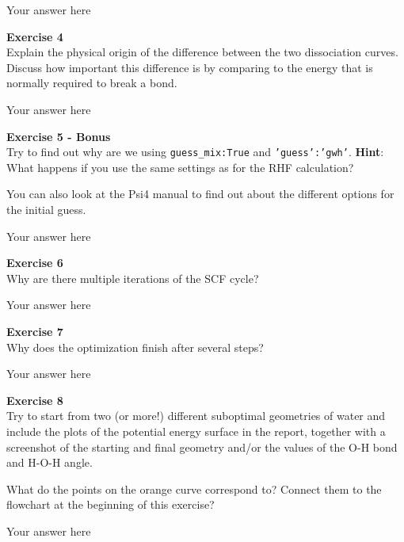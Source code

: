 \documentclass{article}
\begin{document}
Your answer here

\begin{mdframed}
\textbf{Exercise 4}\\
Explain the physical origin of the difference between the two
dissociation curves. Discuss how important this difference is by
comparing to the energy that is normally required to break a bond.
\end{mdframed}

Your answer here

\begin{mdframed}
\textbf{Exercise 5 - Bonus}\\
Try to find out why are we using \texttt{guess\_mix:True} and \texttt{'guess':'gwh'}. \textbf{Hint}: What happens if you use the same settings as for the RHF calculation?

You can also look at the Psi4 manual to find out about the different options for the initial guess.
\end{mdframed}

Your answer here

\begin{mdframed}
\textbf{Exercise 6}\\
Why are there multiple iterations of the SCF cycle?
\end{mdframed}

Your answer here

\begin{mdframed}
\textbf{Exercise 7}\\
Why does the optimization finish after several steps?
\end{mdframed}

Your answer here

\begin{mdframed}
\textbf{Exercise 8}\\
Try to start from two (or more!) different suboptimal geometries of water and include the plots of the potential energy surface in the report, together with a screenshot of the starting and final geometry and/or the values of the O-H bond and H-O-H angle.

What do the points on the orange curve correspond to? Connect them to the flowchart at the beginning of this exercise?
\end{mdframed}

Your answer here
\end{document}
